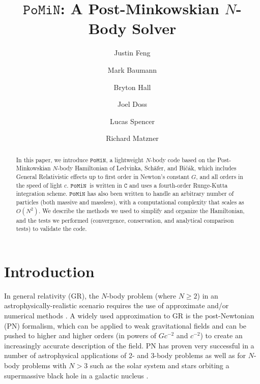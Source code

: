 \documentclass[aps,onecolumn,notitlepage,eqsecnum,nofootinbib,floatfix,superscriptaddress]{revtex4-1}
\newcommand{\codename}{\mathtt{PoMiN}}
\begin{document}
\title{$\codename$: A Post-Minkowskian $N$-Body Solver}

\author{Justin Feng}
\author{Mark Baumann}
\author{Bryton Hall}
\noaffiliation
\author{Joel Doss}
\author{Lucas Spencer}
\noaffiliation
\author{Richard Matzner}



\begin{abstract}
In this paper, we introduce $\codename$, a lightweight $N$-body code based on the Post-Minkowskian $N$-body Hamiltonian of Ledvinka, Sch{\"a}fer, and Bi{\v c}{\'a}k, which includes General Relativistic effects up to first order in Newton's constant $G$, and all orders in the speed of light $c$. $\codename \> $  is written in $\mathtt{C}$ and uses a fourth-order Runge-Kutta integration scheme. $\codename$ has also been written to handle an arbitrary number of particles (both massive and massless), with a computational complexity that scales as $O(N^2)$. We describe the methods we used to simplify and organize the Hamiltonian, and the tests we performed (convergence, conservation, and analytical comparison tests) to validate the code.
\end{abstract}

\maketitle


\section{Introduction}

In general relativity (GR), the $N$-body problem (where $N \geq 2$) in an astrophysically-realistic scenario requires the use of approximate and/or numerical methods \cite{PoissonWill}.  A widely used approximation to GR is the post-Newtonian (PN) formalism, which can be applied to weak gravitational fields and can be pushed to higher and higher orders (in powers of $G c^{-2}$ and $c^{-2}$) to create an increasingly accurate description of the field.  PN has proven very successful in a number of astrophysical applications of 2- and 3-body problems as well as for $N$-body problems with $N>3$ such as the solar system \cite{Kopeikin} and stars orbiting a supermassive black hole in a galactic nucleus \cite{Hamers} \cite{MikkolaMerritt}.
\end{document}
